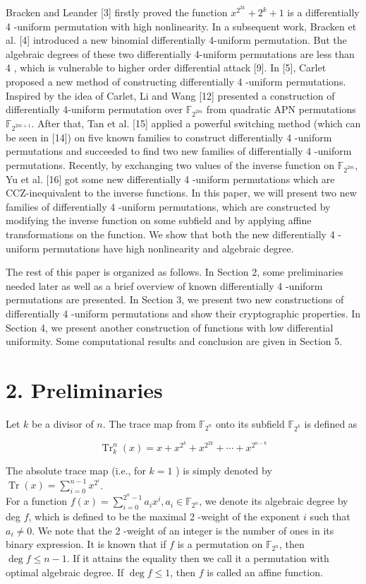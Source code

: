 \documentclass[10pt]{article}
\begin{document}
Bracken and Leander [3] firstly proved the function $x^{2^{2 k}}+2^{k}+1$ is a differentially 4 -uniform permutation with high nonlinearity. In a subsequent work, Bracken et al. [4] introduced a new binomial differentially 4-uniform permutation. But the algebraic degrees of these two differentially 4-uniform permutations are less than 4 , which is vulnerable to higher order differential attack [9]. In [5], Carlet proposed a new method of constructing differentially 4 -uniform permutations. Inspired by the idea of Carlet, Li and Wang [12] presented a construction of differentially 4-uniform permutation over $\mathbb{F}_{2^{2 m}}$ from quadratic APN permutations $\mathbb{F}_{2^{2 m+1}}$. After that, Tan et al. [15] applied a powerful switching method (which can be seen in [14]) on five known families to construct differentially 4 -uniform permutations and succeeded to find two new families of differentially 4 -uniform permutations. Recently, by exchanging two values of the inverse function on $\mathbb{F}_{2^{2 m}}$, Yu et al. [16] got some new differentially 4 -uniform permutations which are CCZ-inequivalent to the inverse functions. In this paper, we will present two new families of differentially 4 -uniform permutations, which are constructed by modifying the inverse function on some subfield and by applying affine transformations on the function. We show that both the new differentially 4 -uniform permutations have high nonlinearity and algebraic degree.

The rest of this paper is organized as follows. In Section 2, some preliminaries needed later as well as a brief overview of known differentially 4 -uniform permutations are presented. In Section 3, we present two new constructions of differentially 4 -uniform permutations and show their cryptographic properties. In Section 4, we present another construction of functions with low differential uniformity. Some computational results and conclusion are given in Section 5.

\section*{2. Preliminaries}
Let $k$ be a divisor of $n$. The trace map from $\mathbb{F}_{2^{n}}$ onto its subfield $\mathbb{F}_{2^{k}}$ is defined as

$$
\operatorname{Tr}_{k}^{n}(x)=x+x^{2^{k}}+x^{2^{2 k}}+\cdots+x^{2^{n-k}}
$$

The absolute trace map (i.e., for $k=1$ ) is simply denoted by $\operatorname{Tr}(x)=\sum_{i=0}^{n-1} x^{2^{i}}$.\\
For a function $f(x)=\sum_{i=0}^{2^{n}-1} a_{i} x^{i}, a_{i} \in \mathbb{F}_{2^{n}}$, we denote its algebraic degree by deg $f$, which is defined to be the maximal 2 -weight of the exponent $i$ such that $a_{i} \neq 0$. We note that the 2 -weight of an integer is the number of ones in its binary expression. It is known that if $f$ is a permutation on $\mathbb{F}_{2^{n}}$, then $\operatorname{deg} f \leqslant n-1$. If it attains the equality then we call it a permutation with optimal algebraic degree. If $\operatorname{deg} f \leqslant 1$, then $f$ is called an affine function.
\end{document}
